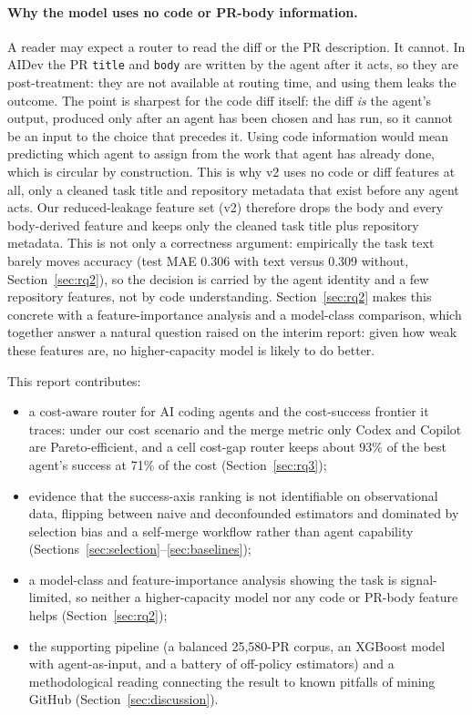 \documentclass[sigconf,nonacm]{acmart}
\begin{document}
\paragraph{Why the model uses no code or PR-body information.} A reader may expect a router to read the diff or the PR description. It cannot. In AIDev the PR \texttt{title} and \texttt{body} are written by the agent after it acts, so they are post-treatment: they are not available at routing time, and using them leaks the outcome. The point is sharpest for the code diff itself: the diff \emph{is} the agent's output, produced only after an agent has been chosen and has run, so it cannot be an input to the choice that precedes it. Using code information would mean predicting which agent to assign from the work that agent has already done, which is circular by construction. This is why v2 uses no code or diff features at all, only a cleaned task title and repository metadata that exist before any agent acts. Our reduced-leakage feature set (v2) therefore drops the body and every body-derived feature and keeps only the cleaned task title plus repository metadata. This is not only a correctness argument: empirically the task text barely moves accuracy (test MAE 0.306 with text versus 0.309 without, Section~\ref{sec:rq2}), so the decision is carried by the agent identity and a few repository features, not by code understanding. Section~\ref{sec:rq2} makes this concrete with a feature-importance analysis and a model-class comparison, which together answer a natural question raised on the interim report: given how weak these features are, no higher-capacity model is likely to do better.

This report contributes:
\begin{itemize}
  \item a cost-aware router for AI coding agents and the cost-success frontier it traces: under our cost scenario and the merge metric only Codex and Copilot are Pareto-efficient, and a cell cost-gap router keeps about 93\% of the best agent's success at 71\% of the cost (Section~\ref{sec:rq3});
  \item evidence that the success-axis ranking is not identifiable on observational data, flipping between naive and deconfounded estimators and dominated by selection bias and a self-merge workflow rather than agent capability (Sections~\ref{sec:selection}--\ref{sec:baselines});
  \item a model-class and feature-importance analysis showing the task is signal-limited, so neither a higher-capacity model nor any code or PR-body feature helps (Section~\ref{sec:rq2});
  \item the supporting pipeline (a balanced 25,580-PR corpus, an XGBoost model with agent-as-input, and a battery of off-policy estimators) and a methodological reading connecting the result to known pitfalls of mining GitHub (Section~\ref{sec:discussion}).
\end{itemize}
\end{document}
